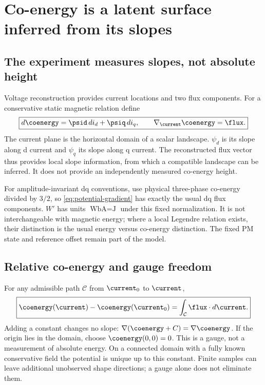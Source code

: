 \section{Co-energy is a latent surface inferred from its slopes}
\label{sec:potential}
\subsection{The experiment measures slopes, not absolute height}
Voltage reconstruction provides current locations and two flux components.
For a conservative static magnetic relation define
\begin{equation}
 \boxed{d\coenergy=\psid\,di_d+\psiq\,di_q,\qquad
        \nabla_{\current}\coenergy=\flux.}\label{eq:potential-gradient}
\end{equation}
The current plane is the horizontal domain of a scalar landscape.
$\psi_d$ is its slope along d current and $\psi_q$ its slope along q current.
The reconstructed flux vector thus provides local slope information, from
which a compatible landscape can be inferred. It does not provide an
independently measured co-energy height.

For amplitude-invariant dq conventions, use physical three-phase co-energy
divided by $3/2$, so \cref{eq:potential-gradient} has exactly the usual dq
flux components. $W'$ has units $\si{\weber\ampere}=\si{\joule}$ under
this fixed normalization. It is not interchangeable with magnetic energy;
where a local Legendre relation exists, their distinction is the usual energy
versus co-energy distinction. The fixed PM state and reference offset remain
part of the model.


\subsection{Relative co-energy and gauge freedom}
For any admissible path $\mathcal C$ from $\current_0$ to $\current$,
\begin{equation}
 \boxed{\coenergy(\current)-\coenergy(\current_0)
       =\int_{\mathcal C}\flux\cdot d\current.}\label{eq:path-integral}
\end{equation}
Adding a constant changes no slope:
$\nabla(\coenergy+C)=\nabla\coenergy$. If the origin lies in the domain, choose
$\coenergy(0,0)=0$. This is a gauge, not a measurement of absolute energy.
On a connected domain with a fully known conservative field the potential
is unique up to this constant. Finite samples can leave additional unobserved
shape directions; a gauge alone does not eliminate them.

